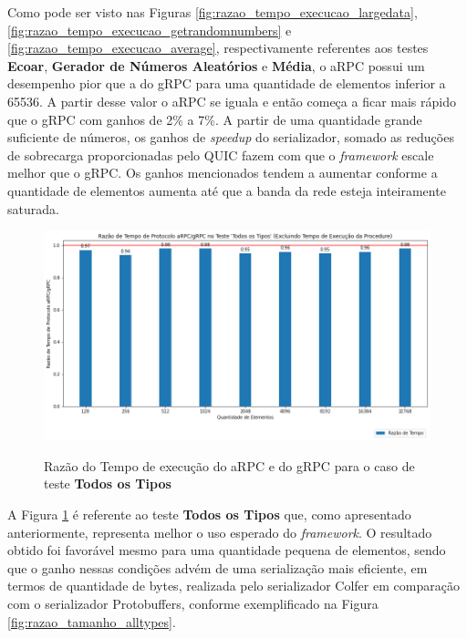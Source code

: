 Como pode ser visto nas Figuras \ref{fig:razao_tempo_execucao_largedata}, \ref{fig:razao_tempo_execucao_getrandomnumbers} e \ref{fig:razao_tempo_execucao_average}, respectivamente referentes aos testes \textbf{Ecoar}, \textbf{Gerador de Números Aleatórios} e \textbf{Média}, o aRPC possui um desempenho pior que a do gRPC para uma quantidade de elementos inferior a 65536. A partir desse valor o aRPC se iguala e então começa a ficar mais rápido que o gRPC com ganhos de 2\% a 7\%. A partir de uma quantidade grande suficiente de números, os ganhos de \textit{speedup} do serializador, somado as reduções de sobrecarga proporcionadas pelo QUIC fazem com que o \textit{framework} escale melhor que o gRPC. Os ganhos mencionados tendem a aumentar conforme a quantidade de elementos aumenta até que a banda da rede esteja inteiramente saturada.


\begin{figure}[ht]
    \centering
    \caption{Razão do Tempo de execução do aRPC e do gRPC para o caso de teste \textbf{Todos os Tipos}}
    \includegraphics[width=\textwidth]{figuras/framework/razao_tempo_execucao_alltypes.png}
    \label{fig:razao_tempo_execucao_alltypes}
\end{figure}

A Figura \ref{fig:razao_tempo_execucao_alltypes} é referente ao teste \textbf{Todos os Tipos} que, como apresentado anteriormente, representa melhor o uso esperado do \textit{framework}. O resultado obtido foi favorável mesmo para uma quantidade pequena de elementos, sendo que o ganho nessas condições advém de uma serialização mais eficiente, em termos de quantidade de bytes, realizada pelo serializador Colfer em comparação com o serializador Protobuffers, conforme exemplificado na Figura \ref{fig:razao_tamanho_alltypes}.

